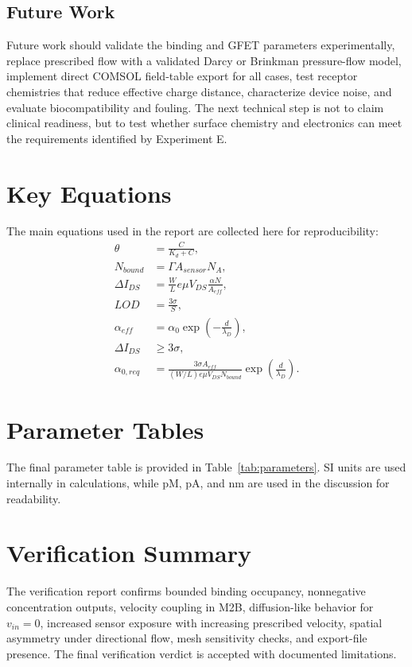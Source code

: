 ﻿\documentclass[12pt,a4paper,oneside]{report}
\begin{document}
\section{Future Work}
Future work should validate the binding and GFET parameters experimentally, replace prescribed flow with a validated Darcy or Brinkman pressure-flow model, implement direct COMSOL field-table export for all cases, test receptor chemistries that reduce effective charge distance, characterize device noise, and evaluate biocompatibility and fouling. The next technical step is not to claim clinical readiness, but to test whether surface chemistry and electronics can meet the requirements identified by Experiment E.

\appendix

\chapter{Key Equations}
The main equations used in the report are collected here for reproducibility:
\begin{align}
\theta &= \frac{C}{K_d+C},\\
N_{bound} &= \Gamma A_{sensor}N_A,\\
\Delta I_{DS} &= \frac{W}{L}e\mu V_{DS}\frac{\alpha N}{A_{eff}},\\
LOD &= \frac{3\sigma}{S},\\
\alpha_{eff} &= \alpha_0\exp\left(-\frac{d}{\lambda_D}\right),\\
\Delta I_{DS} &\geq 3\sigma,\\
\alpha_{0,req} &= \frac{3\sigma A_{eff}}{(W/L)e\mu V_{DS}N_{bound}}\exp\left(\frac{d}{\lambda_D}\right).
\end{align}

\chapter{Parameter Tables}
The final parameter table is provided in Table~\ref{tab:parameters}. SI units are used internally in calculations, while pM, pA, and nm are used in the discussion for readability.

\chapter{Verification Summary}
The verification report confirms bounded binding occupancy, nonnegative concentration outputs, velocity coupling in M2B, diffusion-like behavior for $v_{in}=0$, increased sensor exposure with increasing prescribed velocity, spatial asymmetry under directional flow, mesh sensitivity checks, and export-file presence. The final verification verdict is accepted with documented limitations.
\end{document}
